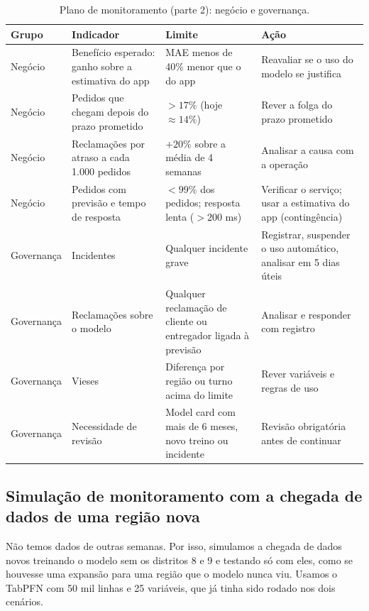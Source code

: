 \documentclass[11pt,a4paper]{article}
\begin{document}
\begin{table}[H]
\centering\footnotesize
\begin{tabularx}{\linewidth}{l >{\raggedright\arraybackslash}p{4.2cm} L L}
\toprule
Grupo & Indicador & Limite & Ação \\
\midrule
Negócio & Benefício esperado: ganho sobre a estimativa do app & MAE menos de 40\% menor que o do app & Reavaliar se o uso do modelo se justifica \\
Negócio & Pedidos que chegam depois do prazo prometido & $>17\%$ (hoje $\approx 14\%$) & Rever a folga do prazo prometido \\
Negócio & Reclamações por atraso a cada 1.000 pedidos & $+20\%$ sobre a média de 4 semanas & Analisar a causa com a operação \\
Negócio & Pedidos com previsão e tempo de resposta & $<99\%$ dos pedidos; resposta lenta ($>200$ ms) & Verificar o serviço; usar a estimativa do app (contingência) \\
\midrule
Governança & Incidentes & Qualquer incidente grave & Registrar, suspender o uso automático, analisar em 5 dias úteis \\
Governança & Reclamações sobre o modelo & Qualquer reclamação de cliente ou entregador ligada à previsão & Analisar e responder com registro \\
Governança & Vieses & Diferença por região ou turno acima do limite & Rever variáveis e regras de uso \\
Governança & Necessidade de revisão & Model card com mais de 6 meses, novo treino ou incidente & Revisão obrigatória antes de continuar \\
\bottomrule
\end{tabularx}
\caption{Plano de monitoramento (parte 2): negócio e governança.}
\label{tab:mon2}
\end{table}

\subsection{Simulação de monitoramento com a chegada de dados de uma região nova}

Não temos dados de outras semanas. Por isso, simulamos a chegada de dados novos 
treinando o modelo sem os distritos 8 e 9 e testando só com eles, como se houvesse uma expansão
para uma região que o modelo nunca viu. Usamos o TabPFN com 50 mil linhas e 25 variáveis, que já
tinha sido rodado nos dois cenários.
\end{document}
